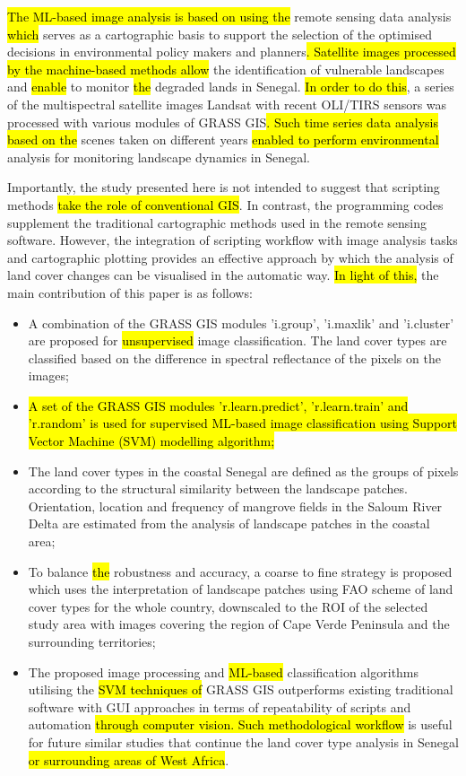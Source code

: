 \documentclass[earth,article,submit,pdftex,moreauthors]{Definitions/mdpi}
\begin{document}
\hl{The ML-based image analysis is based on using the }remote sensing data analysis \hl{which }serves as a cartographic basis to support the selection of the optimised decisions in environmental policy makers and planners\hl{. Satellite images processed by the machine-based methods allow }the identification of vulnerable landscapes and \hl{enable} to monitor \hl{the }degraded lands in Senegal. \hl{In order to do this}, a series of the multispectral satellite images Landsat with recent OLI/TIRS sensors was processed with various modules of GRASS GIS\hl{. Such time series data analysis based on the} scenes taken on different years \hl{enabled to perform environmental } analysis for monitoring landscape dynamics in Senegal. 

Importantly, the study presented here is not intended to suggest that scripting methods \hl{take the role of conventional GIS}. In contrast, the programming codes\hl{ }supplement the traditional cartographic methods used in the remote sensing software. However, the integration of scripting workflow with image analysis tasks and cartographic plotting provides an effective approach by which the analysis of land cover changes can be visualised in the automatic way. \hl{In light of this, }the main contribution of this paper is as follows: 

\begin{itemize}
  \item A combination of the GRASS GIS modules 'i.group', 'i.maxlik' and 'i.cluster' are proposed for \hl{unsupervised }image classification. The land cover types are classified based on the difference in spectral reflectance of the pixels on the images;
  \item \hl{A set of the GRASS GIS modules 'r.learn.predict', 'r.learn.train' and 'r.random' is used for supervised ML-based image classification using Support Vector Machine (SVM) modelling algorithm;}
  \item The land cover types in the coastal Senegal are defined as the groups of pixels according to the structural similarity between the landscape patches. Orientation, location and frequency of mangrove fields in the Saloum River Delta are estimated from the analysis of landscape patches in the coastal area;
  \item To balance \hl{the} robustness and accuracy, a coarse to fine strategy is proposed which uses the interpretation of landscape patches using FAO scheme of land cover types for the whole country, downscaled to the ROI of the selected study area with images covering the region of Cape Verde Peninsula and the surrounding territories;
  \item The proposed image processing and \hl{ML-based }classification algorithms utilising the \hl{SVM techniques of }GRASS GIS outperforms existing traditional software with GUI approaches in terms of repeatability of scripts and automation \hl{through computer vision. Such methodological workflow }is useful for future similar studies that continue the land cover type analysis in Senegal \hl{or surrounding areas of West Africa}.
\end{itemize}
\end{document}
